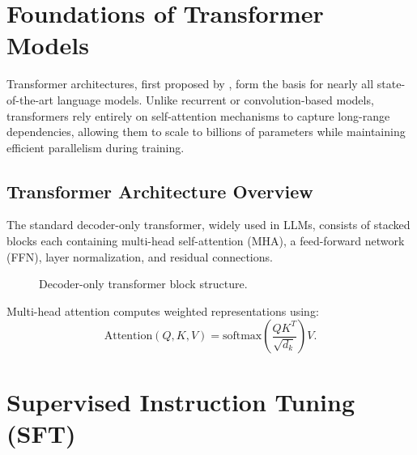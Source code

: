 \documentclass[12pt]{report}
\begin{document}
\section{Foundations of Transformer Models}

Transformer architectures, first proposed by \cite{vaswani2017attention}, form the basis for nearly all state-of-the-art language models. Unlike recurrent or convolution-based models, transformers rely entirely on self-attention mechanisms to capture long-range dependencies, allowing them to scale to billions of parameters while maintaining efficient parallelism during training.

\subsection{Transformer Architecture Overview}

The standard decoder-only transformer, widely used in LLMs, consists of stacked blocks each containing multi-head self-attention (MHA), a feed-forward network (FFN), layer normalization, and residual connections.

\begin{figure}[H]
\centering
{}
\caption{Decoder-only transformer block structure.}
\end{figure}

Multi-head attention computes weighted representations using:
\begin{equation}
\text{Attention}(Q,K,V) = \text{softmax}\left(\frac{QK^{T}}{\sqrt{d_k}}\right)V.
\end{equation}

\section{Supervised Instruction Tuning (SFT)}
\end{document}

